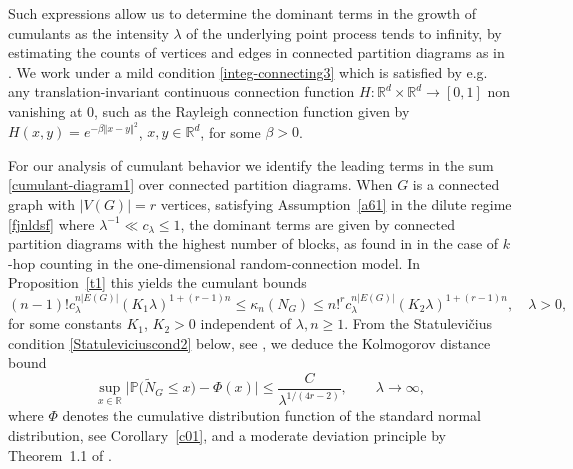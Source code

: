 \documentclass[bj,authoryear,noshowframe]{imsart}
\theoremstyle{plain}
\theoremstyle{remark}
\def\P{\mathbb{P}}
\def\real{{\mathord{\mathbb R}}}
\begin{document}
 
 Such expressions allow us to determine the dominant terms in the growth of
 cumulants as the intensity $\lambda$ of the underlying point process tends to infinity,
 by estimating the counts of vertices and edges in connected partition diagrams
 as in \cite{khorunzhiy}. 
 We work under a mild condition \eqref{integ-connecting3} 
 which is satisfied by e.g. any translation-invariant
 continuous connection function $H : \real^d\times \real^d \to [0,1]$ non vanishing at $0$, such as the {Rayleigh} connection function
  given by $H(x,y) = e^{ - \beta \Vert x - y\Vert^2}$, $x,y\in \real^d$, for some $\beta > 0$. 
 
 
 For our analysis of cumulant behavior
 we identify the leading terms in the sum \eqref{cumulant-diagram1}
 over connected partition diagrams. 
 When $G$ is a connected graph with $|V(G)|=r$ vertices,
 satisfying
 Assumption~\ref{a61} in the dilute regime \eqref{fjnldsf}
 where $\lambda^{-1} \ll c_\lambda \leq 1$, 
 the dominant terms are given by connected partition diagrams with the
 highest number of blocks, 
 as found in \cite{privaultkhops}
 in the case of $k$-hop counting in the one-dimensional random-connection model. 
 In Proposition~\ref{t1} this yields the cumulant bounds 
$$
 (n-1)! c_\lambda^{n |E(G)| } ( K_1 \lambda )^{1+(r-1)n} 
 \leq 
  \kappa_n(N_G)
\leq 
n!^r c_\lambda^{n |E(G) |} ( K_2 \lambda )^{1+(r-1)n},
\quad \lambda > 0, 
$$
 for some constants $K_1$, $K_2>0$ independent of $\lambda, n\geq 1$. 
 From the {Statulevi\v{c}ius condition}
 \eqref{Statuleviciuscond2} below, see \cite{rudzkis,doering},
 we deduce the Kolmogorov distance bound 
$$
\sup_{x\in \real}
\big| \P \big( \widetilde{N}_G \leq x \big) - \Phi (x) \big| \leq
\frac{C }{\lambda^{1/(4r - 2)}},
\qquad \lambda \to \infty, 
$$ 
 where $\Phi$ denotes the cumulative distribution function of the standard normal distribution, 
see Corollary~\ref{c01}, and a moderate deviation principle
by Theorem~1.1 of \cite{doring}.

\end{document}
